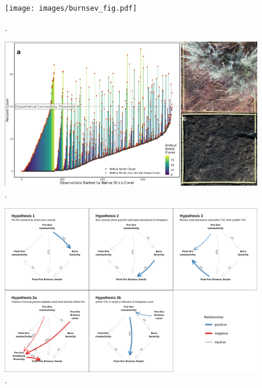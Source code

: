 \documentclass[
  12pt,
]{article}
\begin{document}
\newpage

\begin{figure}
\centering
\texttt{[image: images/burnsev\_fig.pdf]}
\caption{.}
\end{figure}

\newpage

\begin{figure}
\centering
\includegraphics{images/fig2_seed_bank.pdf}
\caption{.}
\end{figure}

\newpage

\begin{figure}
\centering
\includegraphics{images/conceptual_figure.png}
\caption{.}
\end{figure}

\newpage
\end{document}
